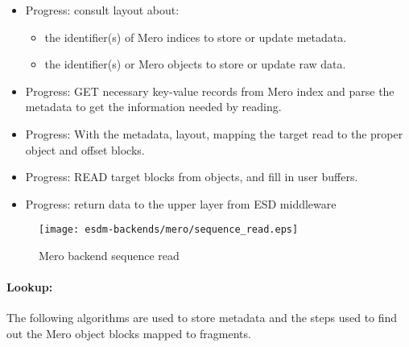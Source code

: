 \begin{itemize}
	\item Progress: consult layout about:
	\begin{itemize}
		\item the identifier(s) of Mero indices to store or update metadata.
		\item the identifier(s) or Mero objects to store or update raw data.
	\end{itemize}
	\item Progress: GET necessary key-value records from Mero index and parse the %
			metadata to get the information needed by reading.
	\item Progress: With the metadata, layout, mapping the target read to the proper object
			and offset blocks.
	\item Progress: READ target blocks from objects, and fill in user buffers.
	\item Progress: return data to the upper layer from ESD middleware
\end{itemize}
\begin{figure}
	\centering
	\texttt{[image: esdm-backends/mero/sequence\_read.eps]}
	\caption{Mero backend sequence read}
	\label{fig:mero backend sequence read}
\end{figure}



\paragraph{Lookup:}

The following algorithms are used to store metadata and the steps used to
find out the Mero object blocks mapped to fragments.

